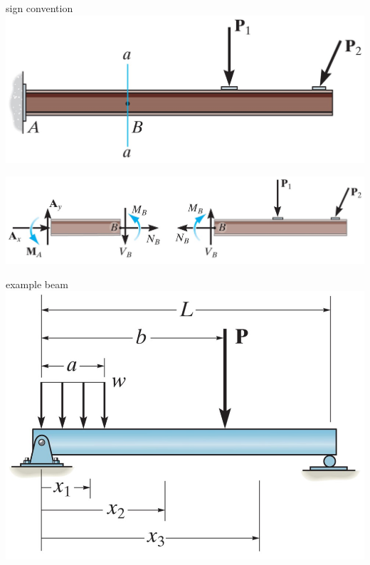 \begin{frame}{sign convention}
\protect\hypertarget{sign-convention}{}
\includegraphics{../images/beam-internal.jpg}

\includegraphics{../images/beam-internal-cut.jpg}
\end{frame}

\begin{frame}{example beam}
\protect\hypertarget{example-beam}{}
\includegraphics{../images/piece-wise-beam.jpg}
\end{frame}

